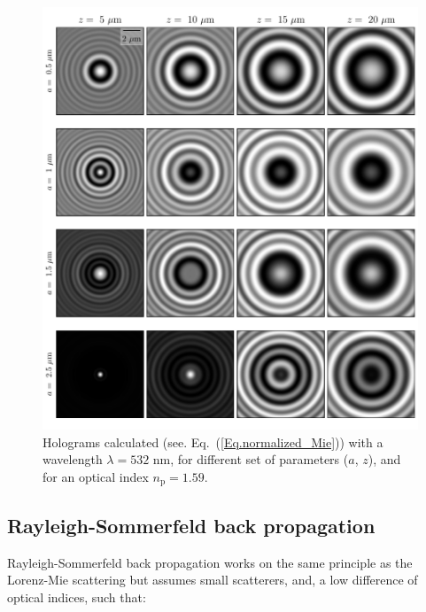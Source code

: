 \begin{figure}
	\centering
	\includegraphics{02_body/chapter2/images/holo_size_exemple/holos_fix_n.pdf}
	\caption{Holograms calculated (see. Eq.~(\ref{Eq.normalized_Mie})) with a wavelength $\lambda = 532$ nm, for different set of parameters ($a$, $z$), and for an optical index $n_\mathrm{p} = 1.59$.~\href{https://github.com/eXpensia/Confined-Brownian-Motion/blob/main/02_body/chapter2/images/holo_size_exemple/holosize_variation.ipynb}{\faGithub}}
	\label{fig:holo_fix_n}
\end{figure}

\clearpage
\newpage

\subsection{Rayleigh-Sommerfeld back propagation}





Rayleigh-Sommerfeld back propagation \cite{wilson_3d_2012} works on the same principle as the Lorenz-Mie scattering but assumes small scatterers, and, a low difference of optical indices, such that:


